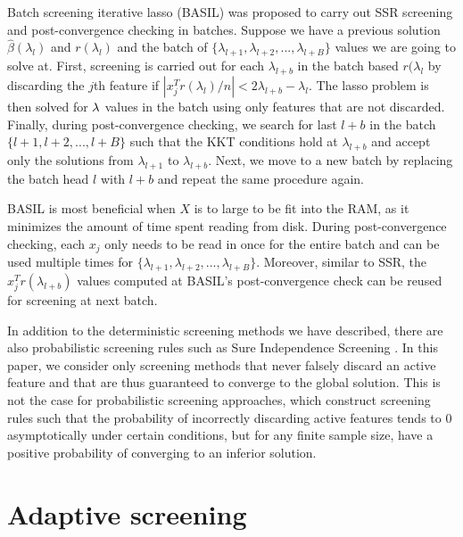 Batch screening iterative lasso (BASIL) \citep{qian2019fast} was proposed to carry out SSR screening and post-convergence checking in batches. Suppose we have a previous solution $\hat{\beta}(\lambda_l)$ and $r(\lambda_l)$ and the batch of $\{\lambda_{l+1},\lambda_{l+2},...,\lambda_{l+B}\}$ values we are going to solve at. First, screening is carried out for each $\lambda_{l+b}$ in the batch based $r(\lambda_l$ by discarding the $j$th feature if $|x_j^Tr(\lambda_l)/n|<2\lambda_{l+b}-\lambda_l$. The lasso problem is then solved for $\lambda$ values in the batch using only features that are not discarded. Finally, during post-convergence checking, we search for last $l+b$ in the batch $\{l+1,l+2,...,l+B\}$ such that the KKT conditions hold at $\lambda_{l+b}$ and accept only the solutions from $\lambda_{l+1}$ to $\lambda_{l+b}$. Next, we move to a new batch by replacing the batch head $l$ with $l+b$ and repeat the same procedure again.

BASIL is most beneficial when $X$ is to large to be fit into the RAM, as it minimizes the amount of time spent reading from disk. During post-convergence checking, each $x_j$ only needs to be read in once for the entire batch and can be used multiple times for $\{\lambda_{l+1},\lambda_{l+2},...,\lambda_{l+B}\}$. Moreover, similar to SSR, the $x_j^Tr(\lambda_{l+b})$ values computed at BASIL's post-convergence check can be reused for screening at next batch.

In addition to the deterministic screening methods we have described, there are also probabilistic screening rules such as Sure Independence Screening \citep{Fan2008}. In this paper, we consider only screening methods that never falsely discard an active feature and that are thus guaranteed to converge to the global solution. This is not the case for probabilistic screening approaches, which construct screening rules such that the probability of incorrectly discarding active features tends to 0 asymptotically under certain conditions, but for any finite sample size, have a positive probability of converging to an inferior solution.

\section{Adaptive screening}
\label{sec:method}


